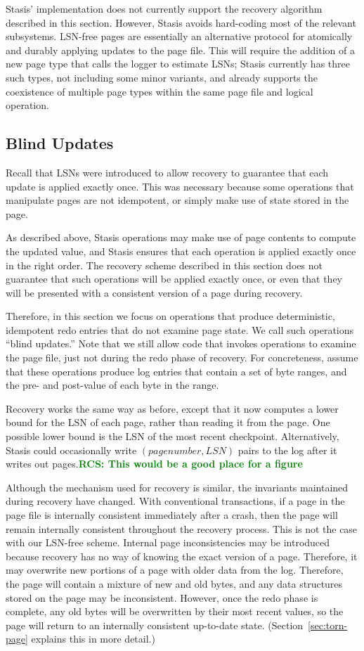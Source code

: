 \documentclass[letterpaper,twocolumn,10pt]{article}
\newcommand{\yad}{Stasis\xspace}
\newcommand{\yads}{Stasis'\xspace}
\newcommand{\rcs}[1]{\textcolor{green}{\bf RCS: #1}}
\begin{document}
\yads implementation does not currently support the recovery algorithm
described in this section.  However, \yad avoids hard-coding most of
the relevant subsystems.  LSN-free pages are essentially an
alternative protocol for atomically and durably applying updates to
the page file.  This will require the addition of a new page type that
calls the logger to estimate LSNs; \yad currently has three such
types, not including some minor variants, and already supports the
coexistence of multiple page types within the same page file and
logical operation.

\subsection{Blind Updates}

Recall that LSNs were introduced to allow recovery to guarantee that
each update is applied exactly once.  This was necessary because some
operations that manipulate pages are not idempotent, or simply make
use of state stored in the page.

As described above, \yad operations may make use of page contents to
compute the updated value, and \yad ensures that each operation is
applied exactly once in the right order. The recovery scheme described
in this section does not guarantee that such operations will be
applied exactly once, or even that they will be presented with a
consistent version of a page during recovery.

Therefore, in this section we focus on operations that produce
deterministic, idempotent redo entries that do not examine page state.
We call such operations ``blind updates.''  Note that we still allow
code that invokes operations to examine the page file, just not during the redo phase of recovery.
For concreteness, assume that these operations produce log
entries that contain a set of byte ranges, and the pre- and post-value
of each byte in the range.

Recovery works the same way as before, except that it now computes
a lower bound for the LSN of each page, rather than reading it from the page.
One possible lower bound is the LSN of the most recent checkpoint.  Alternatively, \yad could occasionally write $(page number, LSN)$ pairs to the log after it writes out pages.\rcs{This would be a good place for a figure}

Although the mechanism used for recovery is similar, the invariants
maintained during recovery have changed.  With conventional
transactions, if a page in the page file is internally consistent
immediately after a crash, then the page will remain internally
consistent throughout the recovery process.  This is not the case with
our LSN-free scheme.  Internal page inconsistencies may be introduced
because recovery has no way of knowing the exact version of a page.
Therefore, it may overwrite new portions of a page with older data
from the log.  Therefore, the page will contain a mixture of new and
old bytes, and any data structures stored on the page may be
inconsistent.  However, once the redo phase is complete, any old bytes
will be overwritten by their most recent values, so the page will
return to an internally consistent up-to-date state.
(Section~\ref{sec:torn-page} explains this in more detail.)
\end{document}
